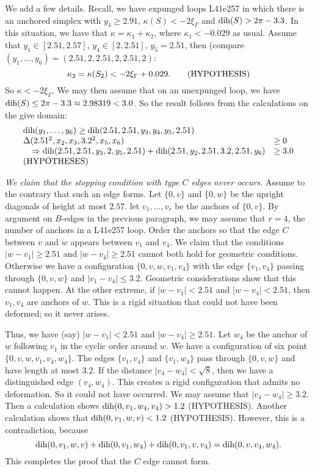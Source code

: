 \documentclass[11pt]{amsart}
\def\op#1{{\text{#1}}}
\def\text{\hbox}
\begin{document}
We add a few details.  Recall, we have expunged loops L41e257 in which there is an anchored simplex with $y_4\ge 2.91$, $\kappa(S)<-2\xi_\Gamma$ and $\op{dih}(S)>2\pi-3.3$.  In this situation, we have that $\kappa = \kappa_1 + \kappa_2$, where $\kappa_1 < -0.029$ as usual.  Assume that
$y_1\in[2.51,2.57]$, $y_4\in[2,2.51]$, $y_5=2.51$, then (compare $(y_1,\ldots,y_6) = (2.51,2,2.51,2,2.51,2)$: 
   $$\kappa_2 =\kappa(S_2) < -2\xi_\Gamma + 0.029.\qquad 
      \text{(HYPOTHESIS)}$$
So $\kappa < -2\xi_\Gamma$.  We may then assume that on an unexpunged
loop, we have $\op{dih}(S)\le 2\pi-3.3\approx 2.98319 < 3.0$.
So the result follows from the calculations on the give domain:
    $$
    \begin{array}{lllll}
    \op{dih}(y_1,\ldots,y_6) \ge \op{dih}(2.51,2.51,y_3,y_4,y_5,2.51)&\\
    \Delta(2.51^2,x_2,x_3,3.2^2,x_5,x_6) &\ge 0 \\ \quad \Rightarrow 
    \op{dih}(2.51,2.51,y_3,2,y_5,2.51) + \op{dih}(2.51,y_2,2.51,3.2,2.51,y_6) &\ge 3.0\\
    \text{(HYPOTHESES)}
    \end{array} 
    $$

{\it We claim that the stopping condition with type $C$ edges never
occurs.}  Assume to the contrary that such an edge forms.
Let $\{0,v\}$ and $\{0,w\}$ be the upright diagonals of height at most
$2.57$.  let $v_1,\ldots,v_r$ be the anchors of $\{0,v\}$.  By argument on $B$-edges in the previous
paragraph, we may assume that $r=4$, the number of anchors in a L41e257 loop.  Order the anchors so
that the edge $C$ between $v$ and $w$ appears
between $v_1$ and $v_4$.  We claim that the
conditions $|w-v_1|\ge 2.51$ and $|w-v_4|\ge 2.51$ cannot
both hold for geometric conditions.
Otherwise we have a configuration $\{0,v,w,v_1,v_4\}$ with the edge $\{v_1,v_4\}$ passing through $\{0,v,w\}$ and $|v_1-v_4|\le 3.2$.  Geometric considerations show that this cannot happen.  At the other extreme, if $|w-v_1|<2.51$ and $|w-v_4|<2.51$, then $v_1,v_4$ are anchors of $w$.  This is a rigid situation that could not have been deformed; so it never arises.  

Thus, we have (say) $|w-v_1|<2.51$ and $|w-v_4|\ge 2.51$.  Let $w_4$ be the anchor of $w$ following $v_1$ in the cyclic order around $w$.
We have a configuration of six point $\{0,v,w,v_1,v_4,w_4\}$.  The edges $\{v_1,v_4\}$ and $\{v_1,w_4\}$ pass through $\{0,v,w\}$ and have length at most $3.2$.  If the distance $|v_4-w_4|<\sqrt8$, then we have a distinguished edge $(v_4,w_4)$.  This creates a rigid configuration that admits no deformation.  So it could not have occurred.  We may assume that $|v_4-w_4|\ge 3.2$.  Then a calculation shows $\op{dih}(0,v_1,w_4,v_4) > 1.2$ (HYPOTHESIS).    Another calculation shows that
$\op{dih}(0,v_1,w,v) < 1.2$ (HYPOTHESIS).  However, this is a contradiction, because
  $$
  \op{dih}(0,v_1,w,v)+\op{dih}(0,v_1,w_4) + \op{dih}(0,v_1,v,v_4) = \op{dih}(0,v,v_4,w_4).
  $$
This completes the proof that the $C$ edge cannot form.
\end{document}
